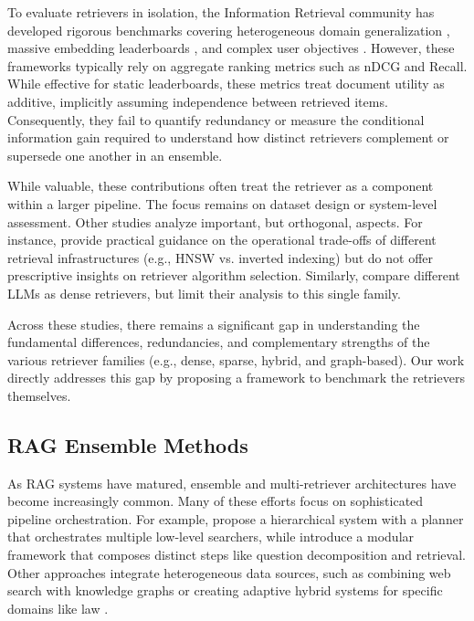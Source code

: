 \documentclass{article}
\theoremstyle{plain}
\theoremstyle{definition}
\theoremstyle{remark}
\begin{document}
To evaluate retrievers in isolation, the Information Retrieval community has developed rigorous benchmarks covering heterogeneous domain generalization \citep{thakur2021beir}, massive embedding leaderboards \citep{muennighoff2023mteb}, and complex user objectives \citep{wang2024birco}. However, these frameworks typically rely on aggregate ranking metrics such as nDCG and Recall. While effective for static leaderboards, these metrics treat document utility as additive, implicitly assuming independence between retrieved items. Consequently, they fail to quantify redundancy or measure the conditional information gain required to understand how distinct retrievers complement or supersede one another in an ensemble.

While valuable, these contributions often treat the retriever as a component within a larger pipeline. The focus remains on dataset design or system-level assessment. Other studies analyze important, but orthogonal, aspects. For instance, \citet{lin2024operational} provide practical guidance on the operational trade-offs of different retrieval infrastructures (e.g., HNSW vs. inverted indexing) but do not offer prescriptive insights on retriever algorithm selection. Similarly, \citet{zhang2025comparative} compare different LLMs as dense retrievers, but limit their analysis to this single family. 

Across these studies, there remains a significant gap in understanding the fundamental differences, redundancies, and complementary strengths of the various retriever families (e.g., dense, sparse, hybrid, and graph-based). Our work directly addresses this gap by proposing a framework to benchmark the retrievers themselves.

\subsection{RAG Ensemble Methods}
As RAG systems have matured, ensemble and multi-retriever architectures have become increasingly common. Many of these efforts focus on sophisticated pipeline orchestration. For example, \citet{zhang2025levelrag} propose a hierarchical system with a planner that orchestrates multiple low-level searchers, while \citet{wu2025composerag} introduce a modular framework that composes distinct steps like question decomposition and retrieval. Other approaches integrate heterogeneous data sources, such as combining web search with knowledge graphs \citep{xie2024weknow} or creating adaptive hybrid systems for specific domains like law \citep{kalra2024hypa}.
\end{document}

